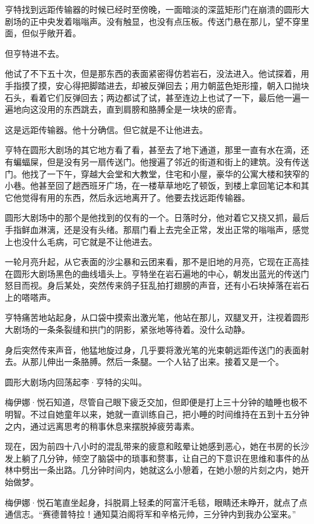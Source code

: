 \documentclass[AutoFakeBold=true]{book}
\begin{document}
亨特找到远距传输器的时候已经时至傍晚，一面暗淡的深蓝矩形门在崩溃的圆形大剧场的正中央发着嗡嗡声。没有触显，也没有点压板。传送门悬在那儿，望不穿里面，但似乎敞开着。

但亨特进不去。

他试了不下五十次，但是那东西的表面紧密得仿若岩石，没法进入。他试探着，用手指摸了摸，安心得把脚踏进去，却被反弹回去；用力朝蓝色矩形撞，朝入口抛块石头，看着它们反弹回去；两边都试了试，甚至连边上也试了一下，最后他一遍一遍地向这没用的东西跳去，直到肩膀和胳膊全是一块块的瘀青。

这是远距传输器。他十分确信。但它就是不让他进去。

亨特在圆形大剧场的其它地方看了看，甚至去了地下通道，那里一直有水在滴，还有蝙蝠屎，但是没有另一扇传送门。他搜遍了邻近的街道和街上的建筑。没有传送门。他找了一下午，穿越大会堂和大教堂，住宅和小屋，豪华的公寓大楼和狭窄的小巷。他甚至回了趟西班牙广场，在一楼草草地吃了顿饭，到楼上拿回笔记本和其它他觉得有用的东西，然后永远地离开了。他要去找远距传输器。

圆形大剧场中的那个是他找到的仅有的一个。日落时分，他对着它又挠又抓，最后手指鲜血淋漓，还是没有头绪。那扇门看上去完全正常，发出正常的嗡嗡声，感觉上也没什么毛病，可它就是不让他进去。

一轮月亮升起，从它表面的沙尘暴和云团来看，那不是旧地的月亮，它现在正高挂在圆形大剧场黑色的曲线墙头上。亨特坐在岩石遍地的中心，朝发出蓝光的传送门怒目而视。身后某处，突然传来鸽子狂乱拍打翅膀的声音，还有小石块掉落在岩石上的嗒嗒声。

亨特痛苦地站起身，从口袋中摸索出激光笔，他站在那儿，双腿叉开，注视着圆形大剧场的一条条裂缝和拱门的阴影，紧张地等待着。没什么动静。

身后突然传来声音，他猛地旋过身，几乎要将激光笔的光束朝远距传送门的表面射去。从那儿伸出一条胳膊。然后一条腿。一个人钻了出来。接着又是一个。

圆形大剧场内回荡起李·亨特的尖叫。

\vspace*{1em}

梅伊娜·悦石知道，尽管自己眼下疲乏交加，但即便是打上三十分钟的瞌睡也极不明智。不过自她童年以来，她就一直训练自己，把小睡的时间维持在五到十五分钟之内，通过远离思考的稍事休息来摆脱掉疲劳毒素。

现在，因为前四十八小时的混乱带来的疲意和眩晕让她感到恶心，她在书房的长沙发上躺了几分钟，倾空了脑袋中的琐事和赘事，让自己的下意识在思维和事件的丛林中劈出一条出路。几分钟时间内，她就这么小憩着，在她小憩的片刻之内，她开始做梦。

梅伊娜·悦石笔直坐起身，抖脱肩上轻柔的阿富汗毛毯，眼睛还未睁开，就点了点通信志。``赛德普特拉！通知莫泊阁将军和辛格元帅，三分钟内到我办公室来。''
\end{document}
